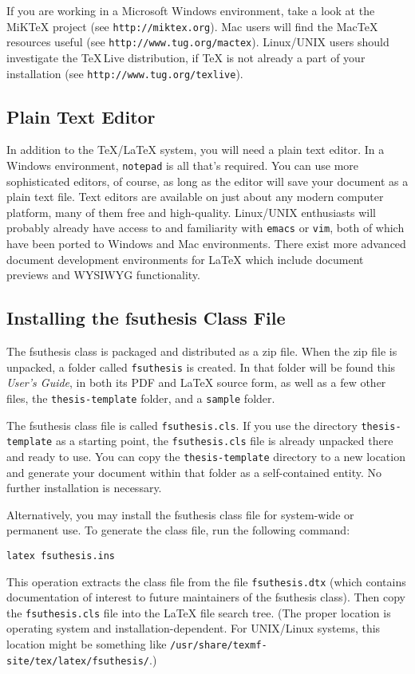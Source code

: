 \documentclass[11pt,letterpaper]{article}
\newcommand*{\acro}[1]{{\small\textsc{#1}}}
\newcommand*{\booktitle}[1]{\textit{#1}}
\newcommand*{\complit}[1]{\texttt{#1}}
\newcommand*{\latexclass}[1]{\textsf{#1}}
\newcommand*{\fsuth}{\latexclass{fsuthesis}}
\renewcommand{\-}{\discretionary{}{}{}}
\begin{document}
If you are working in a Microsoft Windows environment, take a look at
the MiK\TeX{} project (see \complit{http://miktex.org}).  Mac users
will find the \textsf{Mac}\TeX{} resources useful (see
\complit{http://www.tug.org/mactex}).  Linux/\acro{UNIX} users should
investigate the \TeX{}\,Live distribution, if \TeX{} is not already a
part of your installation (see \complit{http://www.tug.org/texlive}).

\subsection{Plain Text Editor}

In addition to the \TeX/\LaTeX{} system, you will need a plain text
editor.  In a Windows environment, \complit{notepad} is all that's
required.  You can use more sophisticated editors, of course, as long
as the editor will save your document as a plain text file.  Text
editors are available on just about any modern computer platform, many
of them free and high-quality.  Linux/\acro{UNIX} enthusiasts will
probably already have access to and familiarity with \complit{emacs}
or \complit{vim}, both of which have been ported to Windows and Mac
environments.  There exist more advanced document development
environments for \LaTeX{} which include document previews and
\acro{WYSIWYG} functionality.

\subsection{Installing the \fsuth{} Class File}

The \fsuth{} class is packaged and distributed as a zip file.  When
the zip file is unpacked, a folder called \complit{fsuthesis} is
created.  In that folder will be found this \booktitle{User's Guide},
in both its \acro{PDF} and \LaTeX{} source form, as well as a few
other files, the \complit{thesis-template} folder, and a
\complit{sample} folder.

The \fsuth{} class file is called \complit{fsuthesis.cls}.  If you use
the directory \complit{thesis-template} as a starting point, the
\complit{fsuthesis.cls} file is already unpacked there and ready to
use.  You can copy the \complit{thesis-template} directory to a new
location and generate your document within that folder as a
self-contained entity.  No further installation is necessary.

Alternatively, you may install the \fsuth{} class file for system-wide
or permanent use.  To generate the class file, run the following
command:
\begin{verbatim}
latex fsuthesis.ins
\end{verbatim}
This operation extracts the class file from the file
\complit{fsuthesis.dtx} (which contains documentation of interest to
future maintainers of the \fsuth{} class).  Then copy the
\complit{fsuthesis.cls} file into the \LaTeX{} file search tree.  (The
proper location is operating system and installation-dependent.  For
\acro{UNIX}/Linux systems, this location might be something like
\complit{/usr/\-share/\-texmf-site/\-tex/\-latex/\-fsuthesis/}.)
\end{document}
